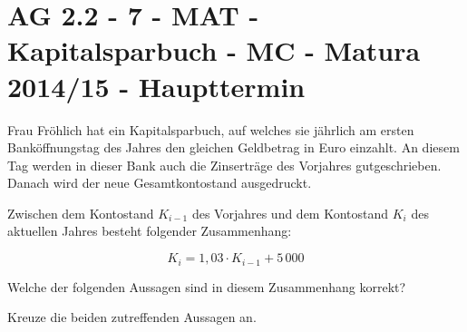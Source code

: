 \section{AG 2.2 - 7 - MAT - Kapitalsparbuch - MC - Matura 2014/15 - Haupttermin}

\begin{beispiel}[AG 2.2]{1} %
Frau Fröhlich hat ein Kapitalsparbuch, auf welches sie jährlich am ersten Bank\-öffnungstag des Jahres den gleichen Geldbetrag in Euro einzahlt. An diesem Tag werden in dieser Bank auch die
Zinserträge des Vorjahres gutgeschrieben. Danach wird der neue Gesamtkontostand ausgedruckt. \leer

Zwischen dem Kontostand $K_{i-1}$ des Vorjahres und dem Kontostand $K_i$ des aktuellen Jahres besteht folgender Zusammenhang: 

$$K_i=1,03\cdot K_{i-1} + 5\,000$$

Welche der folgenden Aussagen sind in diesem Zusammenhang korrekt?

Kreuze die beiden zutreffenden Aussagen an.

\end{beispiel}